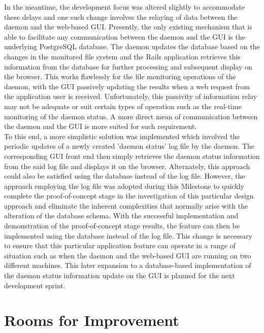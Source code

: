 In the meantime, the development focus was altered slightly to accommodate these delays and one such change involves the relaying of data between the daemon and the web-based GUI. Presently, the only existing mechanism that is able to facilitate any communication between the daemon and the GUI is the underlying PostgreSQL database. The daemon updates the database based on the changes in the monitored file system and the Rails application retrieves this information from the database for further processing and subsequent display on the browser. This works flawlessly for the file monitoring operations of the daemon, with the GUI passively updating the results when a web request from the application user is received. Unfortunately, this passivity of information relay may not be adequate or suit certain types of operation such as the real-time monitoring of the daemon status. A more direct mean of communication between the daemon and the GUI is more suited for such requirement. \\

To this end, a more simplistic solution was implemented which involved the periodic updates of a newly created 'daemon status' log file by the daemon. The corresponding GUI front end then simply retrieves the daemon status information from the said log file and displays it on the browser. Alternately, this approach could also be satisfied using the database instead of the log file. However, the approach employing the log file was adopted during this Milestone to quickly complete the proof-of-concept stage in the investigation of this particular design approach and eliminate the inherent complexities that normally arise with the alteration of the database schema. With the successful implementation and demonstration of the proof-of-concept stage results, the feature can then be implemented using the database instead of the log file. This change is necessary to ensure that this particular application feature can operate in a range of situation such as when the daemon and the web-based GUI are running on two different machines. This later expansion to a database-based implementation of the daemon status information update on the GUI is planned for the next development sprint.


\section*{Rooms for Improvement}

